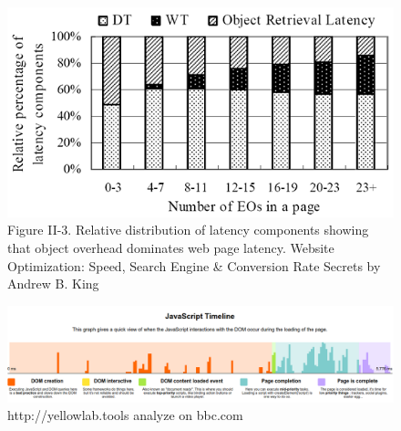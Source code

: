 \documentclass[conference]{IEEEtran}
\begin{document}
\begin{figure}[ht!]
  \includegraphics[width=\linewidth]{overhead.png}
  \caption{Figure II-3. Relative distribution of latency components showing that object overhead dominates web page latency. Website Optimization: Speed, Search Engine \& Conversion Rate Secrets by Andrew B. King}
\end{figure}

\begin{figure}[ht!]
  \includegraphics[width=\linewidth]{jsTimeline.png}
  \caption{http://yellowlab.tools analyze on bbc.com}
\end{figure}
\end{document}
